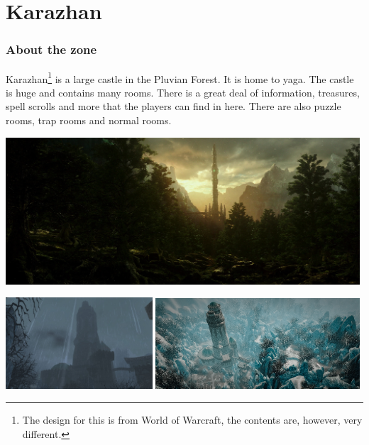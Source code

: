 \section{Karazhan}

\subsubsection{About the zone}

Karazhan\footnote{The design for this is from World of Warcraft, the contents are, however, very different.} is a large castle in the Pluvian Forest. It is home to yaga. The castle is huge and contains many rooms. There is a great deal of information, treasures, spell scrolls and more that the players can find in here. There are also puzzle rooms, trap rooms and normal rooms.

\begin{center}
	\includegraphics[width=0.99\textwidth]{img/Karazhan/9bI9O27.jpg}
\end{center}

\begin{center}
	\includegraphics[width=0.41\textwidth]{img/Karazhan/175259-karazhan.jpg} \includegraphics[width=0.57\textwidth]{img/Karazhan/karazhan.jpg}
\end{center}

